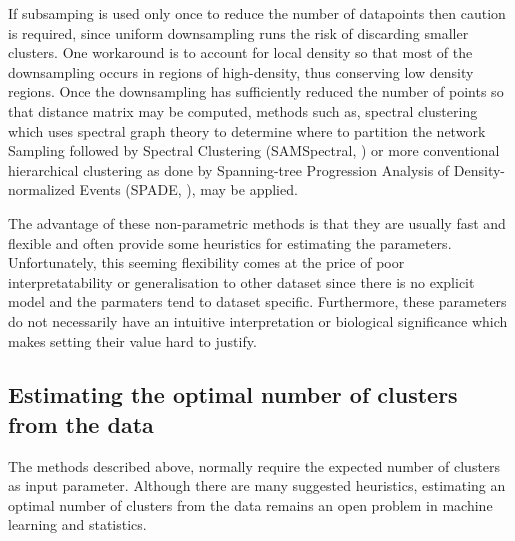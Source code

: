 If subsamping is used only once to reduce the number of datapoints then 
caution is required, since uniform downsampling runs the risk of discarding smaller clusters.
One workaround is to account for local density so that most of the downsampling occurs in regions of high-density,
thus conserving low density regions.
Once the downsampling has sufficiently reduced the number of points so that distance matrix may be computed,
methods such as, spectral clustering which uses spectral graph theory to determine where to partition the network
Sampling followed by Spectral Clustering (SAMSpectral, \citet{Zare:2010cw}) or more conventional hierarchical clustering
as done by Spanning-tree Progression Analysis of Density-normalized Events (SPADE, \citet{Simonds:2011jh}), may be applied.

The advantage of these non-parametric methods is that they are usually fast and flexible and often provide some heuristics for estimating the parameters.  
Unfortunately, this seeming flexibility comes at the price of poor interpretatability or generalisation to other dataset since there is no explicit model
and the parmaters tend to dataset specific.
Furthermore, these parameters do not necessarily have an intuitive interpretation or biological significance which makes setting their value hard to justify.


\subsection{Estimating the optimal number of clusters from the data}

The methods described above, normally require the expected number of clusters as input parameter.
Although there are many suggested heuristics,
estimating an optimal number of clusters from the data remains an open problem in machine learning and statistics.

